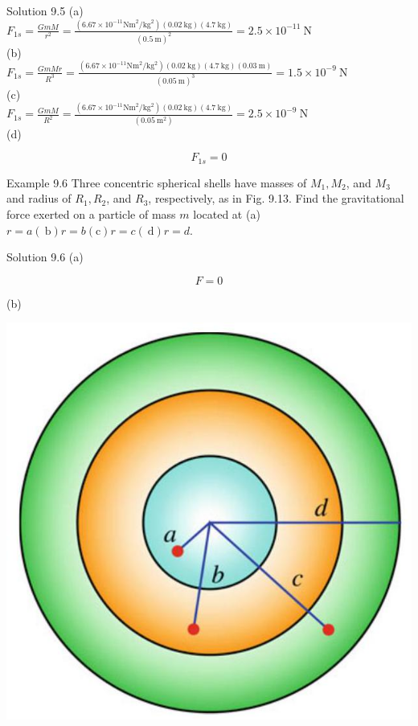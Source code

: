 \documentclass[10pt]{article}
\begin{document}
Solution 9.5 (a)\\
$F_{1 s}=\frac{G m M}{r^{2}}=\frac{\left(6.67 \times 10^{-11} \mathrm{Nm}^{2} / \mathrm{kg}^{2}\right)(0.02 \mathrm{~kg})(4.7 \mathrm{~kg})}{(0.5 \mathrm{~m})^{2}}=2.5 \times 10^{-11} \mathrm{~N}$\\
(b)\\
$F_{1 s}=\frac{G m M r}{R^{3}}=\frac{\left(6.67 \times 10^{-11} \mathrm{Nm}^{2} / \mathrm{kg}^{2}\right)(0.02 \mathrm{~kg})(4.7 \mathrm{~kg})(0.03 \mathrm{~m})}{(0.05 \mathrm{~m})^{3}}=1.5 \times 10^{-9} \mathrm{~N}$\\
(c)\\
$F_{1 s}=\frac{G m M}{R^{2}}=\frac{\left(6.67 \times 10^{-11} \mathrm{Nm}^{2} / \mathrm{kg}^{2}\right)(0.02 \mathrm{~kg})(4.7 \mathrm{~kg})}{\left(0.05 \mathrm{~m}^{2}\right)}=2.5 \times 10^{-9} \mathrm{~N}$\\
(d)

$$
F_{1 s}=0
$$

Example 9.6 Three concentric spherical shells have masses of $M_{1}, M_{2}$, and $M_{3}$ and radius of $R_{1}, R_{2}$, and $R_{3}$, respectively, as in Fig. 9.13. Find the gravitational force exerted on a particle of mass $m$ located at (a) $r=a(\mathrm{~b}) r=b(\mathrm{c}) r=c(\mathrm{~d}) r=d$.

Solution 9.6 (a)

$$
F=0
$$

(b)

\begin{center}
\includegraphics[max width=\textwidth]{2024_09_13_db1f357d2aad0a03eb2eg-149(1)}
\end{center}
\end{document}
